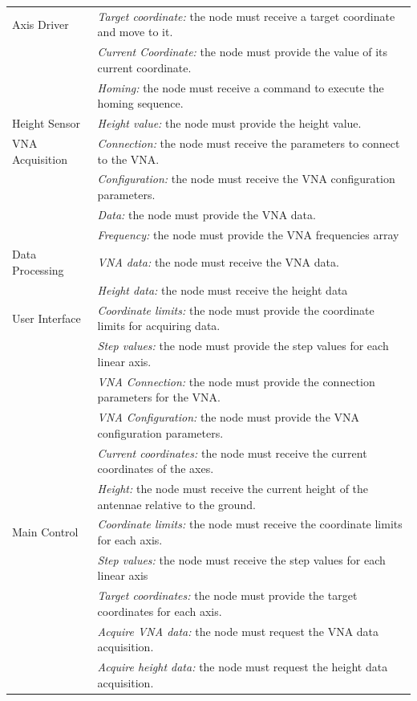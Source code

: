 \documentclass{article}
\begin{document}
\begin{singlespace}
\begin{longtable}{|l|>{\baselineskip=10pt}p{10cm}|}
        Axis Driver & \textit{Target coordinate:} the node must receive a target coordinate and move to it. \\ \cline{2-2}
        & \textit{Current Coordinate:} the node must provide the value of its current coordinate. \\ \cline{2-2}
        & \textit{Homing:} the node must receive a command to execute the homing sequence. \\ \hline
        Height Sensor & \textit{Height value:} the node must provide the height value. \\ \hline 
        VNA Acquisition & \textit{Connection:} the node must receive the parameters to connect to the VNA. \\ \cline{2-2}
        & \textit{Configuration:} the node must receive the VNA configuration parameters. \\ \cline{2-2}
        & \textit{Data:} the node must provide the VNA data. \\ \cline{2-2}
        & \textit{Frequency:} the node must provide the VNA frequencies array \\ \hline
        Data Processing & \textit{VNA data:} the node must receive the VNA data. \\ \cline{2-2}
        & \textit{Height data:} the node must receive the height data \\ \hline
        User Interface & \textit{Coordinate limits:} the node must provide the coordinate limits for acquiring data. \\ \cline{2-2}
        & \textit{Step values:} the node must provide the step values for each linear axis. \\ \cline{2-2}
        & \textit{VNA Connection:} the node must provide the connection parameters for the VNA. \\ \cline{2-2}
        & \textit{VNA Configuration:} the node must provide the VNA configuration parameters. \\ \cline{2-2}
        & \textit{Current coordinates:} the node must receive the current coordinates of the axes. \\ \cline{2-2}
        & \textit{Height:} the node must receive the current height of the antennae relative to the ground. \\ \hline
        Main Control & \textit{Coordinate limits:} the node must receive the coordinate limits for each axis. \\ \cline{2-2}
        & \textit{Step values:} the node must receive the step values for each linear axis \\ \cline{2-2}
        & \textit{Target coordinates:} the node must provide the target coordinates for each axis. \\ \cline{2-2}
        & \textit{Acquire VNA data:} the node must request the VNA data acquisition. \\ \cline{2-2}
        & \textit{Acquire height data:} the node must request the height data acquisition. \\ \hline
    \end{longtable}
\end{singlespace}
\end{document}
